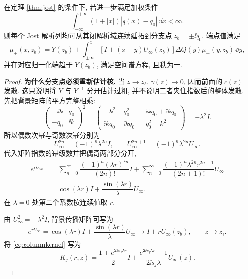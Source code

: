 \begin{proposition}[向分支点的连续延拓]\label{prop:jost-branch}
在定理 \ref{thm:jost} 的条件下, 若进一步满足加权条件
\begin{equation}\label{eq:jost-weighted}
\int_{-\infty}^{+\infty}(1+|x|)|q(x)-q_0|\,\dd x<\infty.
\end{equation}
则每个 Jost 解析列均可从其闭解析域连续延拓到分支点 $z_b=\pm\ii q_0$. 端点值满足
\begin{equation}\label{eq:jost-branch-volterra}
\mu_\pm(x,z_b)=Y(z_b)+\int_{\pm\infty}^{x}
[I+(x-y)U_\infty(z_b)]\Delta Q(y)\mu_\pm(y,z_b)\,\dd y,
\end{equation}
并在对应归一化端趋于 $Y(z_b)$, 满足空间谱方程, 且秩为一.
\end{proposition}
\begin{proof}

\par\medskip\noindent\textbf{为什么分支点必须重新估计核.}\quad 
当 $z\to z_b$, $\gamma(z)\to0$, 因而前面的
$c(z)$ 发散. 这只说明将 $Y$ 与 $Y^{-1}$ 分开估计过粗,
并不说明二者夹住指数后的整体发散.
先把背景矩阵的平方完整相乘:
\[
\begin{pmatrix}-\ii k&q_0\\-q_0&\ii k\end{pmatrix}^2
=\begin{pmatrix}
-k^2-q_0^2&-\ii kq_0+\ii kq_0\\
\ii kq_0-\ii kq_0&-q_0^2-k^2
\end{pmatrix}
=-\lambda^2I.
\]
所以偶数次幂与奇数次幂分别为
\[
U_\infty^{2n}=(-1)^n\lambda^{2n}I,
\qquad
U_\infty^{2n+1}=(-1)^n\lambda^{2n}U_\infty.
\]
代入矩阵指数的幂级数并把偶奇两部分分开,
\begin{align*}
e^{rU_\infty}
&=\sum\limits_{n=0}^{\infty}\dfrac{(-1)^n(\lambda r)^{2n}}{(2n)!}I
+\sum\limits_{n=0}^{\infty}\dfrac{(-1)^n\lambda^{2n}r^{2n+1}}{(2n+1)!}U_\infty\\
&=\cos(\lambda r)I+\dfrac{\sin(\lambda r)}{\lambda}U_\infty.
\end{align*}
在 $\lambda=0$ 处第二个系数按连续值取 $r$.

由 $U_\infty^2=-\lambda^2I$, 背景传播矩阵可写为
\begin{equation}\label{eq:background-propagator}
e^{rU_\infty}
=\cos(\lambda r)I+\dfrac{\sin(\lambda r)}{\lambda}U_\infty
\longrightarrow I+rU_\infty(z_b),\qquad z\to z_b.
\end{equation}
将 \eqref{eq:columnkernel} 写为
\begin{equation}\label{eq:branch-columnkernel}
K_j(r,z)=\dfrac{1+e^{2\ii s_j\lambda r}}{2}I
+\dfrac{e^{2\ii s_j\lambda r}-1}{2\ii s_j\lambda}U_\infty(z).
\end{equation}


\end{proof}
